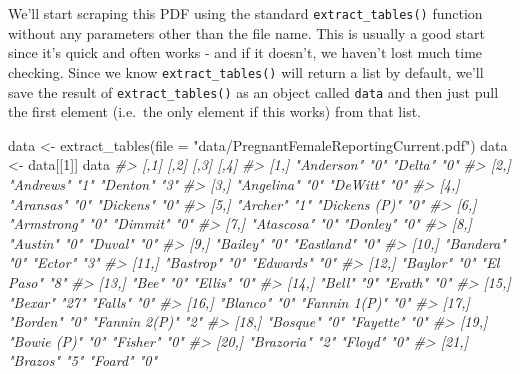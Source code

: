 \documentclass[
  12pt,
  openany]{book}
\newenvironment{Shaded}{\begin{snugshade}}{\end{snugshade}}
\newcommand{\AttributeTok}[1]{\textcolor[rgb]{0.61,0.61,0.61}{#1}}
\newcommand{\CommentTok}[1]{\textcolor[rgb]{0.37,0.37,0.37}{\textit{#1}}}
\newcommand{\DecValTok}[1]{\textcolor[rgb]{0.06,0.06,0.06}{#1}}
\newcommand{\FunctionTok}[1]{\textcolor[rgb]{0,0,0}{#1}}
\newcommand{\NormalTok}[1]{#1}
\newcommand{\OtherTok}[1]{\textcolor[rgb]{0.37,0.37,0.37}{#1}}
\newcommand{\StringTok}[1]{\textcolor[rgb]{0.5,0.5,0.5}{#1}}
\begin{document}
We'll start scraping this PDF using the standard \texttt{extract\_tables()} function without any parameters other than the file name. This is usually a good start since it's quick and often works - and if it doesn't, we haven't lost much time checking. Since we know \texttt{extract\_tables()} will return a list by default, we'll save the result of \texttt{extract\_tables()} as an object called \texttt{data} and then just pull the first element (i.e.~the only element if this works) from that list.

\begin{Shaded}
\begin{Highlighting}[]
\NormalTok{data }\OtherTok{\textless{}{-}} \FunctionTok{extract\_tables}\NormalTok{(}\AttributeTok{file =} \StringTok{"data/PregnantFemaleReportingCurrent.pdf"}\NormalTok{)}
\NormalTok{data }\OtherTok{\textless{}{-}}\NormalTok{ data[[}\DecValTok{1}\NormalTok{]]}
\NormalTok{data}
\CommentTok{\#\textgreater{}       [,1]            [,2] [,3]          [,4]}
\CommentTok{\#\textgreater{}  [1,] "Anderson"      "0"  "Delta"       "0" }
\CommentTok{\#\textgreater{}  [2,] "Andrews"       "1"  "Denton"      "3" }
\CommentTok{\#\textgreater{}  [3,] "Angelina"      "0"  "DeWitt"      "0" }
\CommentTok{\#\textgreater{}  [4,] "Aransas"       "0"  "Dickens"     "0" }
\CommentTok{\#\textgreater{}  [5,] "Archer"        "1"  "Dickens (P)" "0" }
\CommentTok{\#\textgreater{}  [6,] "Armstrong"     "0"  "Dimmit"      "0" }
\CommentTok{\#\textgreater{}  [7,] "Atascosa"      "0"  "Donley"      "0" }
\CommentTok{\#\textgreater{}  [8,] "Austin"        "0"  "Duval"       "0" }
\CommentTok{\#\textgreater{}  [9,] "Bailey"        "0"  "Eastland"    "0" }
\CommentTok{\#\textgreater{} [10,] "Bandera"       "0"  "Ector"       "3" }
\CommentTok{\#\textgreater{} [11,] "Bastrop"       "0"  "Edwards"     "0" }
\CommentTok{\#\textgreater{} [12,] "Baylor"        "0"  "El Paso"     "8" }
\CommentTok{\#\textgreater{} [13,] "Bee"           "0"  "Ellis"       "0" }
\CommentTok{\#\textgreater{} [14,] "Bell"          "9"  "Erath"       "0" }
\CommentTok{\#\textgreater{} [15,] "Bexar"         "27" "Falls"       "0" }
\CommentTok{\#\textgreater{} [16,] "Blanco"        "0"  "Fannin 1(P)" "0" }
\CommentTok{\#\textgreater{} [17,] "Borden"        "0"  "Fannin 2(P)" "2" }
\CommentTok{\#\textgreater{} [18,] "Bosque"        "0"  "Fayette"     "0" }
\CommentTok{\#\textgreater{} [19,] "Bowie (P)"     "0"  "Fisher"      "0" }
\CommentTok{\#\textgreater{} [20,] "Brazoria"      "2"  "Floyd"       "0" }
\CommentTok{\#\textgreater{} [21,] "Brazos"        "5"  "Foard"       "0" }

\end{Highlighting}
\end{Shaded}
\end{document}
